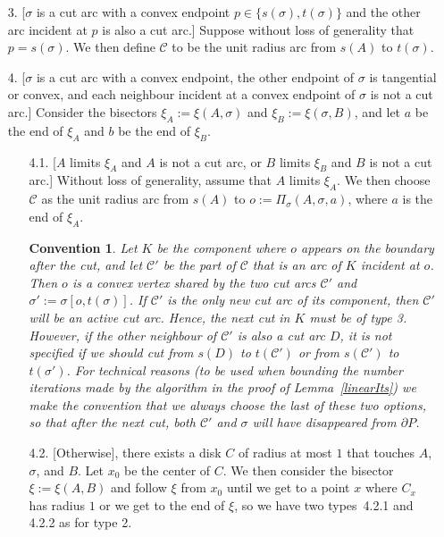 \documentclass{article}
\newcommand{\PP}{P}
\newcommand{\KO}{K}
\newcommand{\se}{\sigma}
\newcommand{\cut}{\mathcal C}
\newcommand{\start}{s}
\newcommand{\terminal}{t}
\newcommand{\arcA}{A}
\newcommand{\arcB}{B}
\newcommand{\mydef}{:=}
\newtheorem{convention}[theorem]{Convention}
\begin{document}
\begin{enumerate}
\item[3.]
[$\se$ is a cut arc with a convex endpoint $p\in\{\start(\se),\terminal(\se)\}$ and the other arc incident at $p$ is also a cut arc.]
Suppose without loss of generality that $p=\start(\se)$. 
We then define $\cut$ to be the unit radius arc from $\start(\arcA)$ to $\terminal(\se)$.

\item[4.]
[$\se$ is a cut arc with a convex endpoint, the other endpoint of $\sigma$ is tangential or convex, and each neighbour incident at a convex endpoint of $\sigma$ is not a cut arc.]
Consider the bisectors $\xi_{\arcA}\mydef\xi(\arcA,\se)$ and $\xi_{\arcB}\mydef \xi(\se,\arcB)$, and let $a$ be the end of $\xi_{\arcA}$ and $b$ be the end of $\xi_{\arcB}$.
\begin{enumerate}
\item[4.1.]
[$\arcA$ limits $\xi_{\arcA}$ and $\arcA$ is not a cut arc, or $\arcB$ limits $\xi_{\arcB}$ and $\arcB$ is not a cut arc.]
Without loss of generality, assume that $\arcA$ limits $\xi_{\arcA}$.
We then choose $\cut$ as the unit radius arc from $\start(\arcA)$ to $o\mydef \Pi_\se(\arcA,\se,a)$, where $a$ is the end of $\xi_{\arcA}$.

\begin{convention}\label{conv:double}
Let $\KO$ be the component where $o$ appears on the boundary after the cut, and let $\cut'$ be the part of $\cut$ that is an arc of $\KO$ incident at $o$.
Then $o$ is a convex vertex shared by the two cut arcs $\cut'$ and $\se'\mydef\se[o,\terminal(\se)]$.
If $\cut'$ is the only new cut arc of its component, then $\cut'$ will be an active cut arc.
Hence, the next cut in $\KO$ must be of type 3.
However, if the other neighbour of $\cut'$ is also a cut arc $D$, it is not specified if we should cut from $\start(D)$ to $\terminal(\cut')$ or from $\start(\cut')$ to $\terminal(\se')$.
For technical reasons (to be used when bounding the number iterations made by the algorithm in the proof of Lemma~\ref{linearIts}) we make the convention that we always choose the last of these two options, so that after the next cut, both $\cut'$ and $\se$ will have disappeared from $\partial\PP$.
\end{convention}

\item[4.2.]
[Otherwise], there exists a disk $C$ of radius at most $1$ that touches $\arcA$, $\se$, and $\arcB$.
Let $x_0$ be the center of $C$.
We then consider the bisector $\xi\mydef\xi(\arcA,\arcB)$ and follow $\xi$ from $x_0$ until we get to a point $x$ where $C_x$ has radius $1$ or we get to the end of $\xi$, so we have two types~4.2.1 and 4.2.2 as for type 2.
\end{enumerate}


\end{enumerate}
\end{document}
